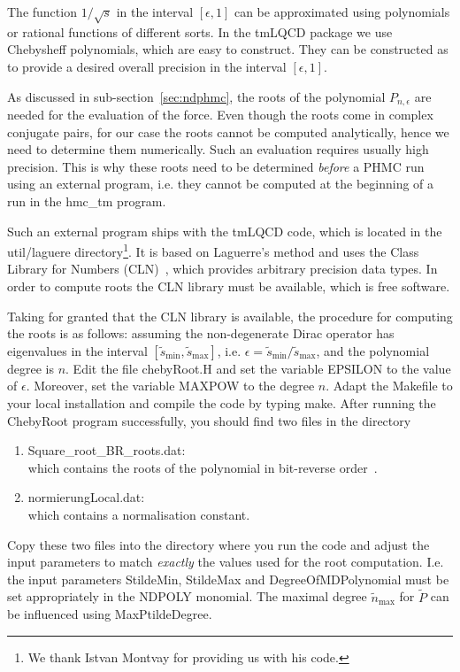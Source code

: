 \label{sec:root}

The function $1/\sqrt{s}$ in the interval $[\epsilon,1]$ can be
approximated using polynomials or rational functions of different
sorts. In the tmLQCD package we use Chebysheff polynomials, which
are easy to construct. They can be constructed as to provide a desired
overall precision in the interval $[\epsilon,1]$. 

As discussed in sub-section~\ref{sec:ndphmc}, the roots of the
polynomial $P_{n,\epsilon}$ are needed for the evaluation of the
force. Even though the roots come in complex conjugate pairs, for our
case the roots cannot be computed analytically, hence we need to
determine them numerically. Such an evaluation requires usually
high precision. This is why these roots need to be determined
\emph{before} a PHMC run using an external program, i.e. they cannot
be computed at the beginning of a run in the {\ttfamily hmc\_tm}
program. 

Such an external program ships with the tmLQCD code, which is located in the
{\ttfamily util/laguere} directory\footnote{We thank Istvan Montvay
  for providing us with his code.}. It is based on Laguerre's
method and uses the Class Library for Numbers
(CLN)~\cite{cln:web}, which provides arbitrary precision data
types. In order to compute roots the CLN library must be available,
which is free software.

Taking for granted that the CLN library is available,
the procedure for computing the roots is as follows: assuming the
non-degenerate Dirac operator has eigenvalues in the interval $[\tilde
s_\mathrm{min},\tilde s_\mathrm{max}]$, i.e. $\epsilon = \tilde
s_\mathrm{min}/\tilde s_\mathrm{max}$, and the polynomial degree is
$n$. Edit the file {\ttfamily chebyRoot.H} and set the
variable {\ttfamily EPSILON} to the value of $\epsilon$. Moreover,
set the variable {\ttfamily MAXPOW} to the degree $n$. Adapt the
{\ttfamily Makefile} to your local installation and compile the code
by typing {\ttfamily make}. After running the {\ttfamily ChebyRoot}
program successfully, you should find two files in the directory
\begin{enumerate}
\item {\ttfamily Square\_root\_BR\_roots.dat}:\\
  which contains the roots of the polynomial in bit-reverse
  order~\cite{Frezzotti:1997ym}.
\item {\ttfamily normierungLocal.dat}:\\
  which contains a normalisation constant. 
\end{enumerate}
Copy these two files into the directory where you run the code and
adjust the input parameters to match \emph{exactly} the values used
for the root computation. I.e. the input parameters {\ttfamily
  StildeMin}, {\ttfamily StildeMax} and {\ttfamily
  DegreeOfMDPolynomial} must be set appropriately in the {\ttfamily
  NDPOLY} monomial. The maximal degree $\tilde n_\mathrm{max}$ for
$\tilde P$ can be influenced using {\ttfamily MaxPtildeDegree}.

